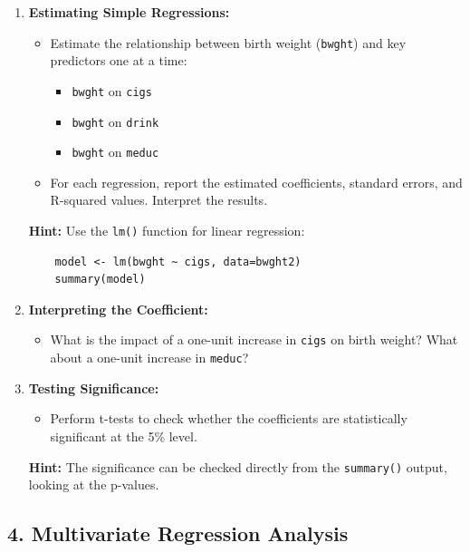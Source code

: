 \documentclass[11pt,a4paper,english]{article}
\begin{document}
\begin{enumerate}[itemsep=-0.5ex]
    \item \textbf{Estimating Simple Regressions:}
    \begin{itemize}[itemsep=-0.5ex]
        \item Estimate the relationship between birth weight (\texttt{bwght}) and key predictors one at a time:
        \begin{itemize}[itemsep=-0.5ex]
            \item \texttt{bwght} on \texttt{cigs}
            \item \texttt{bwght} on \texttt{drink}
            \item \texttt{bwght} on \texttt{meduc}
        \end{itemize}
        \item For each regression, report the estimated coefficients, standard errors, and R-squared values. Interpret the results.
    \end{itemize}
    \textbf{Hint:} Use the \texttt{lm()} function for linear regression:
    \begin{verbatim}
    model <- lm(bwght ~ cigs, data=bwght2)
    summary(model)
    \end{verbatim}
    
    \item \textbf{Interpreting the Coefficient:}
    \begin{itemize}[itemsep=-0.5ex]
        \item What is the impact of a one-unit increase in \texttt{cigs} on birth weight? What about a one-unit increase in \texttt{meduc}?
    \end{itemize}
    
    \item \textbf{Testing Significance:}
    \begin{itemize}[itemsep=-0.5ex]
        \item Perform t-tests to check whether the coefficients are statistically significant at the 5\% level.
    \end{itemize}
    \textbf{Hint:} The significance can be checked directly from the \texttt{summary()} output, looking at the p-values.
\end{enumerate}

\subsection*{4. Multivariate Regression Analysis}
\end{document}
